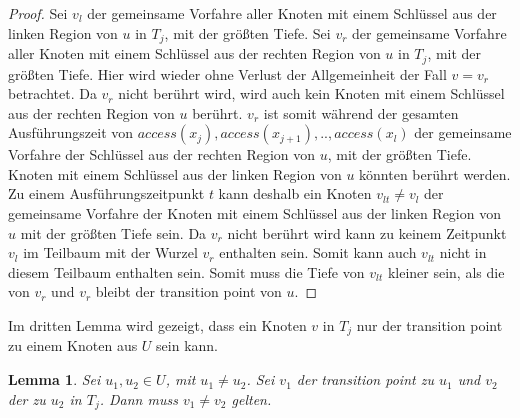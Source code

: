 \documentclass[a4paper,12pt]{article}
\newtheorem{Lemma}{Lemma}[section]
\begin{document}
\begin{proof}
	Sei $v_l$ der gemeinsame Vorfahre aller Knoten mit einem Schlüssel aus der linken Region von $u$ in $T_j$, mit der größten Tiefe. Sei $v_r$ der gemeinsame Vorfahre aller Knoten mit einem Schlüssel aus der rechten Region von $u$ in $T_j$, mit der größten Tiefe. Hier wird wieder ohne Verlust der Allgemeinheit der Fall $v = v_r$ betrachtet. Da $v_r$ nicht berührt wird, wird auch kein Knoten mit einem Schlüssel aus der rechten Region von $u$ berührt. $v_r$ ist somit während der gesamten Ausführungszeit von $\textit{access}\left(x_j\right),\textit{access}\left(x_{j+1}\right),..,\textit{access}\left(x_l\right)$  der gemeinsame Vorfahre der Schlüssel aus der rechten Region von $u$, mit der größten Tiefe. Knoten mit einem Schlüssel aus der linken Region von $u$ könnten berührt werden. Zu einem Ausführungszeitpunkt $t$ kann deshalb ein Knoten $v_{lt} \ne v_l$ der gemeinsame Vorfahre der Knoten mit einem Schlüssel aus der linken Region von $u$ mit der größten Tiefe sein. Da $v_r$ nicht berührt wird kann zu keinem Zeitpunkt $v_l$ im Teilbaum mit der Wurzel $v_r$ enthalten sein. Somit kann auch $v_{lt}$ nicht in diesem Teilbaum enthalten sein. Somit muss die Tiefe von  $v_{lt}$ kleiner sein, als die von $v_r$ und $v_r$ bleibt der transition point von $u$. 
\end{proof}

\noindent Im dritten Lemma wird gezeigt, dass ein Knoten $v$ in $T_j$ nur der transition point zu einem Knoten aus $U$ sein kann.


\begin{Lemma}\label{lemmaDemaine3}
	Sei $u_1, u_2 \in U$, mit $u_1 \ne u_2$.  Sei $v_1$ der transition point zu $u_1$ und $v_2$ der zu $u_2$ in $T_j$. Dann muss $v_1 \neq v_2$ gelten.
\end{Lemma}
\end{document}
